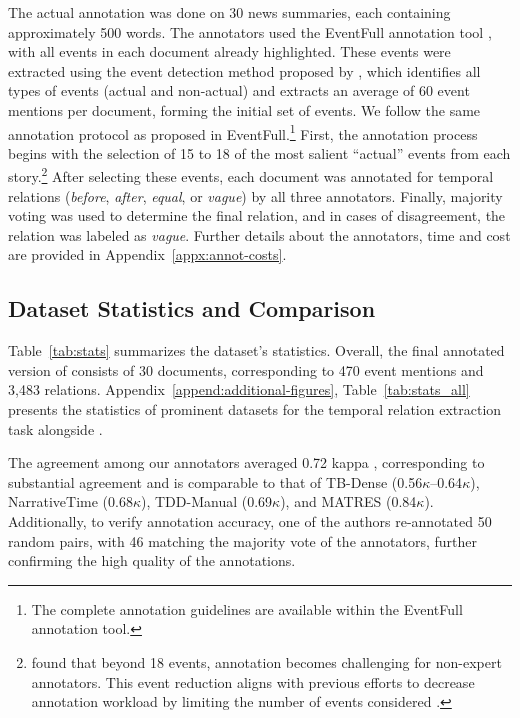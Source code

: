 The actual annotation was done on 30 news summaries, each containing approximately 500 words. The annotators used the EventFull annotation tool \cite{eirew2024eventfullcompleteconsistentevent}, with all events in each document already highlighted. These events were extracted using the event detection method proposed by \citet{cattan-etal-2021-cross-document}, which identifies all types of events (actual and non-actual) and extracts an average of 60 event mentions per document, forming the initial set of events. We follow the same annotation protocol as proposed in EventFull.\footnote{The complete annotation guidelines are available within the EventFull annotation tool.} First, the annotation process begins with the selection of 15 to 18 of the most salient ``actual'' events from each story.\footnote{\citet{eirew2024eventfullcompleteconsistentevent} found that beyond 18 events, annotation becomes challenging for non-expert annotators. This event reduction aligns with previous efforts to decrease annotation workload by limiting the number of events considered \cite{chambers-etal-2014-dense, ning-etal-2018-multi, tan-etal-2024-set}.} After selecting these events, each document was annotated for temporal relations (\textit{before}, \textit{after}, \textit{equal}, or \textit{vague}) by all three annotators. Finally, majority voting was used to determine the final relation, and in cases of disagreement, the relation was labeled as \textit{vague}. Further details about the annotators, time and cost are provided in Appendix~\ref{appx:annot-costs}.


% 


\subsection{Dataset Statistics and Comparison}
\label{section:dataset:statistics}

Table~\ref{tab:stats} summarizes the \App{} dataset's statistics. Overall, the final annotated version of \App{} consists of 30 documents, corresponding to 470 event mentions and 3,483 relations. 
Appendix~\ref{append:additional-figures}, Table~\ref{tab:stats_all} presents the statistics of prominent datasets for the temporal relation extraction
task alongside \App{}. 

The agreement among our annotators averaged 0.72 kappa \cite{kappa-1973}, corresponding to substantial agreement and is comparable to that of TB-Dense \cite{chambers-etal-2014-dense} (0.56$\kappa$–0.64$\kappa$), NarrativeTime \cite{rogers-etal-2024-narrativetime} (0.68$\kappa$), TDD-Manual \cite{naik-etal-2019-tddiscourse} (0.69$\kappa$), and MATRES \cite{ning-etal-2018-multi} (0.84$\kappa$). Additionally, to verify annotation accuracy, one of the authors re-annotated 50 random pairs, with 46 matching the majority vote of the annotators, further confirming the high quality of the annotations.

